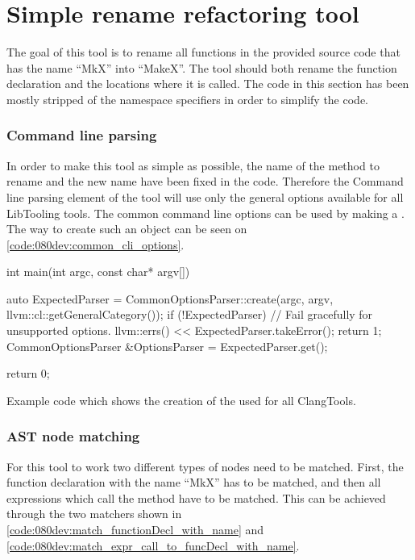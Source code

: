 \section{Simple rename refactoring tool} \label{sec:085tool:example:simple_rename}

The goal of this tool is to rename all functions in the provided source code that has the name ``MkX'' into ``MakeX''. The tool should both rename the function declaration and the locations where it is called. The code in this section has been mostly stripped of the namespace specifiers in order to simplify the code.

\subsubsection*{Command line parsing}

In order to make this tool as simple as possible, the name of the method to rename and the new name have been fixed in the code. Therefore the Command line parsing element of the tool will use only the general options available for all LibTooling tools. The common command line options can be used by making a . The way to create such an object can be seen on \cref{code:080dev:common_cli_options}.

\begin{listing}[H]
    \begin{cppcode}
int main(int argc, const char* argv[]) {
	auto ExpectedParser = CommonOptionsParser::create(argc, argv, llvm::cl::getGeneralCategory());
	if (!ExpectedParser) {
		// Fail gracefully for unsupported options.
		llvm::errs() << ExpectedParser.takeError();
		return 1;
	}
	CommonOptionsParser &OptionsParser = ExpectedParser.get();

    return 0;
}
    \end{cppcode}
    \caption{Example code which shows the creation of the  used for all ClangTools.}
    \label{code:080dev:common_cli_options}
\end{listing}

\subsubsection*{AST node matching}

For this tool to work two different types of nodes need to be matched. First, the function declaration with the name ``MkX'' has to be matched, and then all expressions which call the method have to be matched. This can be achieved through the two matchers shown in \cref{code:080dev:match_functionDecl_with_name} and \cref{code:080dev:match_expr_call_to_funcDecl_with_name}.


